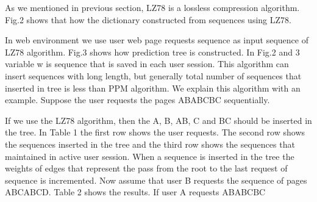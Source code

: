 As we mentioned in previous section, LZ78 is a lossless
compression algorithm. Fig.2 shows that how the
dictionary constructed from sequences using LZ78.

In web environment we use user web page requests sequence
as input sequence of LZ78 algorithm. Fig.3 shows how
prediction tree is constructed. In Fig.2 and 3 variable w is
sequence that is saved in each user session. This algorithm
can insert sequences with long length, but generally total
number of sequences that inserted in tree is less than PPM
algorithm. We explain this algorithm with an example.
Suppose the user requests the pages ABABCBC
sequentially. 

If we use the LZ78 algorithm, then the A, B,
AB, C and BC should be inserted in the tree. In Table 1
the first row shows the user requests. The second row
shows the sequences inserted in the tree and the third row
shows the sequences that maintained in active user
session. When a sequence is inserted in the tree the
weights of edges that represent the pass from the root to
the last request of sequence is incremented. Now assume
that user B requests the sequence of pages ABCABCD.
Table 2 shows the results. If user A requests ABABCBC
